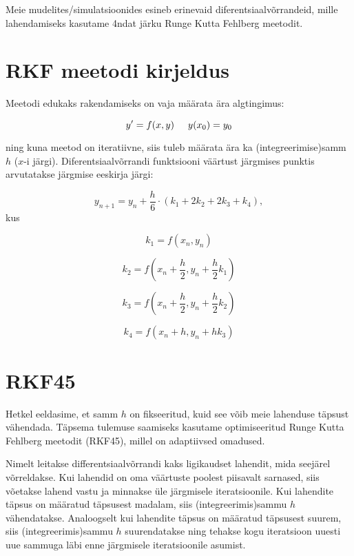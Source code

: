 
\begin{flushleft}

Meie mudelites/simulatsioonides esineb erinevaid diferentsiaalvõrrandeid, mille lahendamiseks kasutame 4ndat järku Runge Kutta Fehlberg meetodit.

\section{RKF meetodi kirjeldus}

Meetodi edukaks rakendamiseks on vaja määrata ära algtingimus:

\begin{equation}
y'=f(x,y) \hspace{5mm} y(x_{0})=y_{0}
\end{equation}

ning kuna meetod on iteratiivne, siis tuleb määrata ära ka (integreerimise)samm $h$ ($x$-i järgi). Diferentsiaalvõrrandi funktsiooni väärtust järgmises punktis arvutatakse järgmise eeskirja järgi:

\begin{equation}
y_{n+1}=y_{n}+\dfrac{h}{6}\cdot(k_{1}+2k_{2}+2k_{3}+k_{4}),
\end{equation}
kus 

\begin{equation}
k_{1}=f(x_{n},y_{n})
\end{equation}

\begin{equation}
k_{2}=f(x_{n}+\dfrac{h}{2},y_{n}+\dfrac{h}{2}k_{1})
\end{equation}

\begin{equation}
k_{3}=f(x_{n}+\dfrac{h}{2},y_{n}+\dfrac{h}{2}k_{2})
\end{equation}

\begin{equation}
k_{4}=f(x_{n}+h,y_{n}+hk_{3})
\end{equation}


\section{RKF45}
Hetkel eeldasime, et samm $h$ on fikseeritud, kuid see võib meie lahenduse täpsust vähendada. Täpsema tulemuse saamiseks kasutame optimiseeritud Runge Kutta Fehlberg meetodit (RKF45), millel on adaptiivsed omadused. 

Nimelt leitakse differentsiaalvõrrandi kaks ligikaudset lahendit, mida seejärel võrreldakse. Kui lahendid on oma väärtuste poolest piisavalt sarnased, siis võetakse lahend vastu ja minnakse üle järgmisele iteratsioonile. Kui lahendite täpsus on määratud täpsusest madalam, siis (integreerimis)sammu $h$ vähendatakse. Analoogselt kui lahendite täpsus on määratud täpsusest suurem, siis (integreerimis)sammu $h$ suurendatakse ning tehakse kogu iteratsioon uuesti uue sammuga läbi enne järgmisele iteratsioonile asumist.


\end{flushleft}
